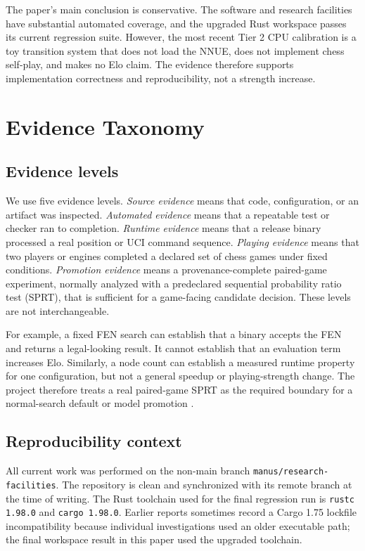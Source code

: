 \documentclass[conference]{IEEEtran}
\newcommand{\code}[1]{\texttt{\small #1}}
\begin{document}
The paper's main conclusion is conservative. The software and research facilities have substantial automated coverage, and the upgraded Rust workspace passes its current regression suite. However, the most recent Tier 2 CPU calibration is a toy transition system that does not load the NNUE, does not implement chess self-play, and makes no Elo claim. The evidence therefore supports implementation correctness and reproducibility, not a strength increase.

\section{Evidence Taxonomy}
\subsection{Evidence levels}
We use five evidence levels. \emph{Source evidence} means that code, configuration, or an artifact was inspected. \emph{Automated evidence} means that a repeatable test or checker ran to completion. \emph{Runtime evidence} means that a release binary processed a real position or UCI command sequence. \emph{Playing evidence} means that two players or engines completed a declared set of chess games under fixed conditions. \emph{Promotion evidence} means a provenance-complete paired-game experiment, normally analyzed with a predeclared sequential probability ratio test (SPRT), that is sufficient for a game-facing candidate decision. These levels are not interchangeable.

For example, a fixed FEN search can establish that a binary accepts the FEN and returns a legal-looking result. It cannot establish that an evaluation term increases Elo. Similarly, a node count can establish a measured runtime property for one configuration, but not a general speedup or playing-strength change. The project therefore treats a real paired-game SPRT as the required boundary for a normal-search default or model promotion \cite{sprt,stockfishfishtest}.

\subsection{Reproducibility context}
All current work was performed on the non-main branch \code{manus/research-facilities}. The repository is clean and synchronized with its remote branch at the time of writing. The Rust toolchain used for the final regression run is \code{rustc 1.98.0} and \code{cargo 1.98.0}. Earlier reports sometimes record a Cargo 1.75 lockfile incompatibility because individual investigations used an older executable path; the final workspace result in this paper used the upgraded toolchain.
\end{document}
